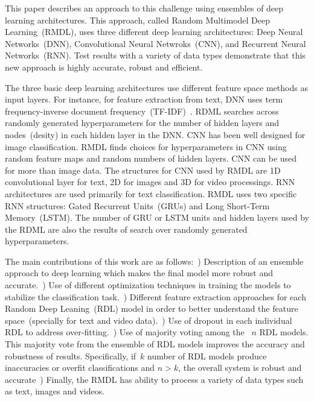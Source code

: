 \documentclass[sigconf, final]{acmart}
\begin{document}
This paper describes an approach to this challenge using ensembles of deep learning architectures. This approach, called Random Multimodel Deep Learning~(RMDL), uses three different deep learning architectures: Deep Neural Networks~(DNN), Convolutional Neural Netwroks~(CNN), and Recurrent Neural Networks~(RNN). Test results with a variety of data types demonstrate that this new approach is highly accurate, robust and efficient.

The three basic deep learning architectures use different feature space methods as input layers. For instance, for feature extraction from text, DNN uses term frequency-inverse document frequency~(TF-IDF)~\cite{robertson2004understanding}. RDML searches across randomly generated hyperparameters for the number of hidden layers and nodes~(desity) in each hidden layer in the DNN.
CNN has been well designed for image classification. RMDL finds choices for hyperparameters in CNN using random feature maps and random numbers of hidden layers. CNN can be used for more than image data. The structures for CNN used by RMDL are 1D convolutional layer for text, 2D for images and 3D for video processings.
RNN architectures are used primarily for text classification. RMDL uses two specific RNN structures: Gated Recurrent Units~(GRUs) and Long Short-Term Memory~(LSTM). The number of GRU or LSTM units and hidden layers used by the RDML are also the results of search over randomly generated hyperparameters.


The main contributions of this work are as follows:~) Description of an ensemble approach to deep learning which makes the final model more robust and accurate.~) Use of different optimization techniques in training the models to stabilize the classification task.~) Different feature extraction approaches for each Random Deep Leaning~(RDL) model in order to better understand the feature space~(specially for text and video data).~) Use of dropout in each individual RDL to address over-fitting.~) Use of majority voting among the ~$n$ RDL models. This majority vote from the ensemble of RDL models improves the accuracy and robustness of results. Specifically, if~$k$ number of RDL models produce inaccuracies or overfit classifications and $n > k$, the overall system is robust and accurate~) Finally, the RMDL has ability to process a variety of data types such as text, images and videos.
\end{document}
